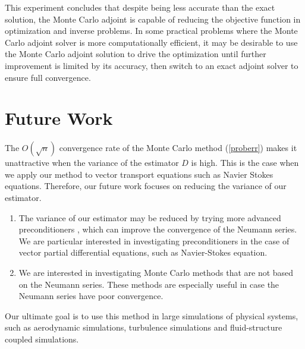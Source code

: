\documentclass[a4paper,11pt]{article}
\theoremstyle{remark}
\theoremstyle{definition}
\begin{document}
        This experiment concludes that despite being less accurate than
        the exact solution, the Monte Carlo adjoint is capable of reducing
        the objective function in optimization and inverse problems.
        In some practical problems where the Monte Carlo adjoint solver is
        more computationally efficient, it may be desirable to use the Monte
        Carlo adjoint solution to drive the optimization until further
        improvement is limited by its accuracy, then switch to an exact
        adjoint solver to ensure full convergence.





\section{Future Work}
    The $O(\sqrt{n})$ convergence rate of the Monte Carlo method
    (\ref{proberr}) makes it unattractive when the variance of the estimator
    $D$ is high.  This is the case when we apply our method to vector
    transport equations such as Navier Stokes equations.  Therefore, our
    future work focuses on reducing the variance of our estimator.
    \begin{enumerate}
    \item The variance of our estimator may be reduced by trying more
          advanced preconditioners \cite{Tan2002,Srinivasan2003}, which can
          improve the convergence of the Neumann series.  We are particular
          interested in investigating preconditioners in the case of vector
          partial differential equations, such as Navier-Stokes equation.
    \item We are interested in investigating Monte Carlo methods that are not
          based on the Neumann series.  These methods are especially useful
          in case the Neumann series have poor convergence.
    \end{enumerate}
    Our ultimate goal is to use this method in large simulations of physical
    systems, such as aerodynamic simulations, turbulence simulations and
    fluid-structure coupled simulations.
\end{document}
